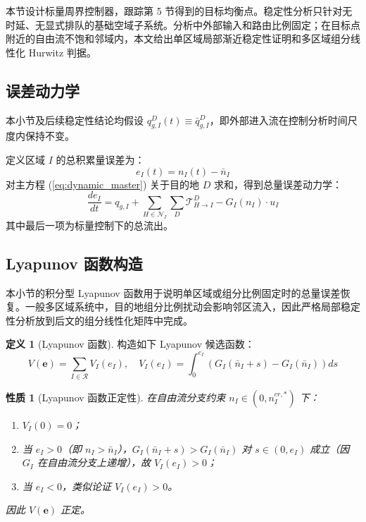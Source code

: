 \documentclass[a4paper,12pt]{article}
\theoremstyle{plain}
\newtheorem{property}[theorem]{性质}
\theoremstyle{definition}
\newtheorem{definition}[theorem]{定义}
\theoremstyle{remark}
\begin{document}
本节设计标量周界控制器，跟踪第 5 节得到的目标均衡点。稳定性分析只针对无时延、无显式排队的基础空域子系统。分析中外部输入和路由比例固定；在目标点附近的自由流不饱和邻域内，本文给出单区域局部渐近稳定性证明和多区域组分线性化 Hurwitz 判据。

\subsection{误差动力学}

本小节及后续稳定性结论均假设 $q_{g,I}^D(t)\equiv\bar q_{g,I}^D$，即外部进入流在控制分析时间尺度内保持不变。

定义区域 $I$ 的总积累量误差为：
\begin{equation}\label{eq:error_def}
    e_I(t) = n_I(t) - \bar{n}_I
\end{equation}
对主方程 (\ref{eq:dynamic_master}) 关于目的地 $D$ 求和，得到总量误差动力学：
\begin{equation}\label{eq:error_dynamics}
    \frac{de_I}{dt} = q_{g,I} + \sum_{H \in \mathcal{N}_I} \sum_D \mathcal{T}_{H \to I}^D - G_I(n_I) \cdot u_I
\end{equation}
其中最后一项为标量控制下的总流出。

\subsection{Lyapunov 函数构造}

本小节的积分型 Lyapunov 函数用于说明单区域或组分比例固定时的总量误差恢复。一般多区域系统中，目的地组分比例扰动会影响邻区流入，因此严格局部稳定性分析放到后文的组分线性化矩阵中完成。

\begin{definition}[Lyapunov 函数]\label{def:lyapunov}
构造如下 Lyapunov 候选函数：
\begin{equation}\label{eq:lyapunov}
    V(\bm{e}) = \sum_{I \in \mathcal{R}} V_I(e_I), \quad V_I(e_I) = \int_0^{e_I} \left( G_I(\bar{n}_I + s) - G_I(\bar{n}_I) \right) ds
\end{equation}
\end{definition}

\begin{property}[Lyapunov 函数正定性]\label{prop:lyapunov_positive}
在自由流分支约束 $n_I \in (0, n_I^{cr,*})$ 下：
\begin{enumerate}
    \item $V_I(0) = 0$；
    \item 当 $e_I > 0$（即 $n_I > \bar{n}_I$），$G_I(\bar{n}_I + s) > G_I(\bar{n}_I)$ 对 $s \in (0, e_I)$ 成立（因 $G_I$ 在自由流分支上递增），故 $V_I(e_I) > 0$；
    \item 当 $e_I < 0$，类似论证 $V_I(e_I) > 0$。
\end{enumerate}
因此 $V(\bm{e})$ 正定。
\end{property}
\end{document}
